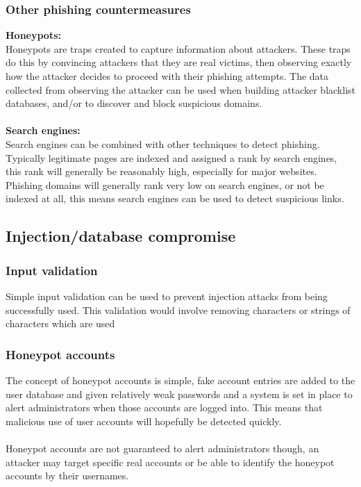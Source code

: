\documentclass[11pt]{article}
\begin{document}
\subsubsection{Other phishing countermeasures}
\large
\textbf{Honeypots:}\\
\normalsize
Honeypots are traps created to capture information about attackers. These traps do this by convincing attackers that they are real victims, then observing exactly how the attacker decides to proceed with their phishing attempts. The data collected from observing the attacker can be used when building attacker blacklist databases, and/or to discover and block suspicious domains.\\\\
\large
\textbf{Search engines:}\\
\normalsize
Search engines can be combined with other techniques to detect phishing. Typically legitimate pages are indexed and assigned a rank by search engines, this rank will generally be reasonably high, especially for major websites. Phishing domains will generally rank very low on search engines, or not be indexed at all, this means search engines can be used to detect suspicious links.


\subsection{Injection/database compromise}

\subsubsection{Input validation}
Simple input validation can be used to prevent injection attacks from being successfully used. This validation would involve removing characters or strings of characters which are used 

\subsubsection{Honeypot accounts}
The concept of honeypot accounts is simple, fake account entries are added to the user database and given relatively weak passwords and a system is set in place to alert administrators when those accounts are logged into.
This means that malicious use of user accounts will hopefully be detected quickly.\\\\
Honeypot accounts are not guaranteed to alert administrators though, an attacker may target specific real accounts or be able to identify the honeypot accounts by their usernames.
\end{document}
